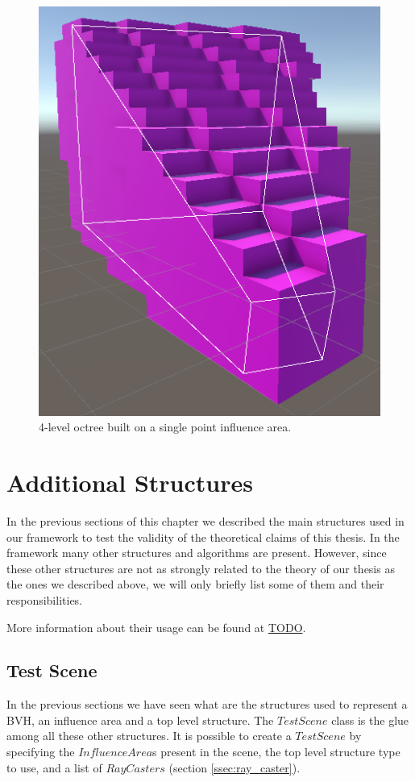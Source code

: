 \documentclass{PoliMi_MasterThesis}
\begin{document}
\begin{figure}[H]
    \centering
    \includegraphics[width=\textwidth]{Images/octree_visualizer.png}
    \caption{4-level octree built on a single point influence area.}
    \label{fig:octree_visualizer}
\end{figure}

\section{Additional Structures} \label{sec:additional_structures}
In the previous sections of this chapter we described the main structures used in our framework to test the validity of the theoretical claims of this thesis. In the framework many other structures and algorithms are present. However, since these other structures are not as strongly related to the theory of our thesis as the ones we described above, we will only briefly list some of them and their responsibilities.

More information about their usage can be found at \url{TODO}.

\subsection{Test Scene}
In the previous sections we have seen what are the structures used to represent a BVH, an influence area and a top level structure. The $TestScene$ class is the glue among all these other structures. It is possible to create a $TestScene$ by specifying the $InfluenceArea$s present in the scene, the top level structure type to use, and a list of $RayCasters$ (section \ref{ssec:ray_caster}).
\end{document}
